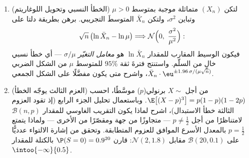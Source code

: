 \begin{problem}
\begin{enumerate}[resume]
  \item (الخطأ النسبي وتحويل اللوغاريتم) لتكن $(X_n)$ 
        متماثلة موجبة بمتوسط $\mu > 0$ وتباين $\sigma^2$،
        ولتكن $\bar X_n$ المتوسطَ التجريبي. برهن بطريقة دلتا
        على
        \[
        \sqrt n\,\bigl(\ln\bar X_n - \ln\mu\bigr)
        \Longrightarrow
        \mathcal N\Bigl(0,\ \frac{\sigma^2}{\mu^2}\Bigr) :
        \]
        فيكون الوسيط المقارب للمقدار $\ln\bar X_n$ هو
        \emph{معامل التغيّر} $\sigma/\mu$ --- أي خطأ نسبي خالٍ
        من السلّم. واستنتج فترةَ ثقة $95\%$ للمتوسط $\mu$ من
        الشكل الضربي $\bar X_n\cdot\eu^{\pm1.96\,\sigma/(\mu\sqrt
        n)}$، واشرح متى يكون مفضَّلًا على
        الشكل الجمعي.
  \item (العزم الثالث يوجّه الخطأ) من أجل $X \sim$ برنولي($p$)
        موسَّطًا، احسب $\E\bigl[(X -
        p)^3\bigr] = p(1-p)(1-2p)$. وباستعمال تحليل الجزء الرابع
        (إذ تقود العزوم الثالثة خطأ الاستبدال)، اشرح لماذا
        يكون التقريب الغاوسي للمقدار $\mathcal B(n, p)$ لامتناظرًا من أجل
        $p \neq \frac12$ --- متجاوزًا من جهة ومقصّرًا من الأخرى
        --- ولماذا يتمتع $p = \frac12$ بالمعدل الأسرع الموافق
        للعزوم المتطابقة. وتحقق من إشارة الالتواء عدديًّا على
        $\mathcal
        B(20, 0.1)$ مقابل $\mathcal N(2, 1.8)$: قارن $\P(S = 0) = 0.9^{20}$ بالكتلة 
        للمقدار $\intoo{-\infty}{0.5}$.
\end{enumerate}
\end{problem}
